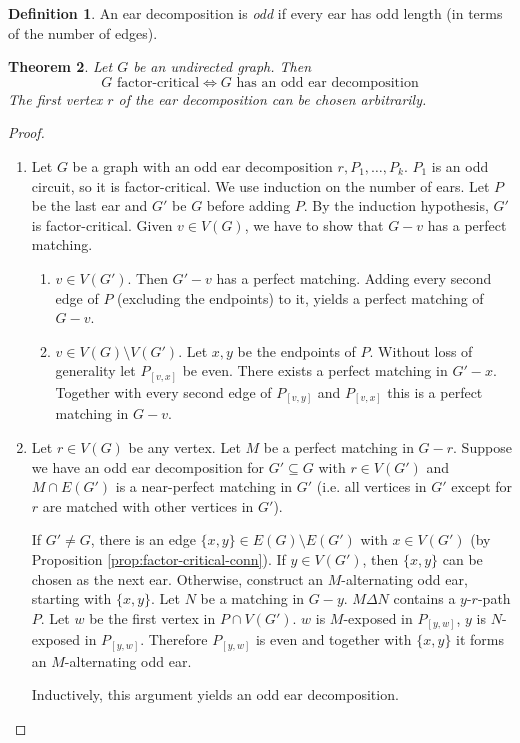 \documentclass[11pt, a4paper]{article}
\newcommand{\set}[1]{\{#1\}}
\newtheorem{theorem}{Theorem}[section]
\theoremstyle{remark}
\theoremstyle{definition}
\newtheorem{definition}[theorem]{Definition}
\begin{document}
\begin{definition}
An ear decomposition is \emph{odd} if every ear has odd length (in terms
of the number of edges).
\end{definition}

\begin{theorem}
Let $G$ be an undirected graph. Then
\[G\text{ factor-critical}
	\Leftrightarrow G\text{ has an odd ear decomposition}\]
The first vertex $r$ of the ear decomposition can be chosen arbitrarily.
\end{theorem}
\begin{proof}\ 
\begin{enumerate}
\item[''$\Leftarrow$'':]
Let $G$ be a graph with an odd ear decomposition $r,P_1,\ldots,P_k$.
$P_1$ is an odd circuit, so it is factor-critical. We use induction on the
number of ears. Let $P$ be the last ear and $G'$ be $G$ before adding $P$.
By the induction hypothesis, $G'$ is factor-critical.
Given $v\in V(G)$, we have to show that $G-v$ has a perfect matching.
\begin{enumerate}
	\item[Case 1:]
	$v\in V(G')$. Then $G'-v$ has a perfect matching. Adding every second
	edge of $P$ (excluding the endpoints) to it, yields a perfect matching
	of $G-v$.
	
	\item[Case 2:]
	$v\in V(G)\setminus V(G')$. Let $x,y$ be the endpoints of $P$. Without
	loss of generality let $P_{[v,x]}$ be even. There exists a perfect
	matching in $G'-x$. Together with every second edge of $P_{[v,y]}$
	and $P_{[v,x]}$ this is a perfect matching in $G-v$.
\end{enumerate}

\item[''$\Rightarrow$'':]
Let $r\in V(G)$ be any vertex. Let $M$ be a perfect matching in $G-r$.
Suppose we have an odd ear decomposition for $G'\subseteq G$ with
$r\in V(G')$ and $M\cap E(G')$ is a near-perfect matching in $G'$ (i.e.
all vertices in $G'$ except for $r$ are matched with other vertices in $G'$).

If $G'\neq G$, there is an edge $\set{x,y}\in E(G)\setminus E(G')$ with
$x\in V(G')$ (by Proposition \ref{prop:factor-critical-conn}). If
$y\in V(G')$, then $\set{x,y}$ can be chosen as the next ear. Otherwise,
construct an $M$-alternating odd ear, starting with $\set{x,y}$. Let $N$
be a matching in $G-y$. $M\Delta N$ contains a $y$-$r$-path $P$. Let $w$ be
the first vertex in $P\cap V(G')$. $w$ is $M$-exposed in $P_{[y,w]}$, $y$
is $N$-exposed in $P_{[y,w]}$. Therefore $P_{[y,w]}$ is even and together
with $\set{x,y}$ it forms an $M$-alternating odd ear.

Inductively, this argument yields an odd ear decomposition.
\end{enumerate}
\end{proof}
\end{document}
